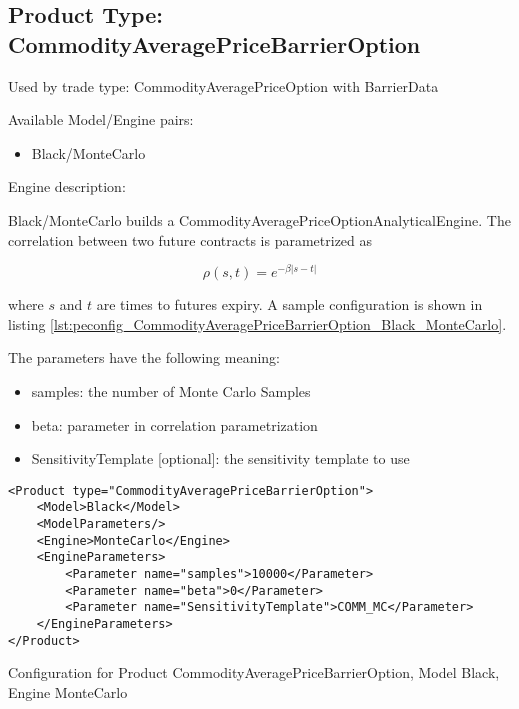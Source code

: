 \subsection{Product Type: CommodityAveragePriceBarrierOption}

Used by trade type: CommodityAveragePriceOption with BarrierData

Available Model/Engine pairs:

\begin{itemize}
\item Black/MonteCarlo
\end{itemize}

Engine description:

Black/MonteCarlo builds a CommodityAveragePriceOptionAnalyticalEngine. The correlation between two future contracts is
parametrized as

$$\rho(s, t) = e^{-\beta |s-t|}$$

where $s$ and $t$ are times to futures expiry. A sample configuration is shown in listing
\ref{lst:peconfig_CommodityAveragePriceBarrierOption_Black_MonteCarlo}.

The parameters have the following meaning:

\begin{itemize}
\item samples: the number of Monte Carlo Samples
\item beta: parameter in correlation parametrization
\item SensitivityTemplate [optional]: the sensitivity template to use 
\end{itemize}

\begin{longlisting}
\begin{verbatim}
<Product type="CommodityAveragePriceBarrierOption">
    <Model>Black</Model>
    <ModelParameters/>
    <Engine>MonteCarlo</Engine>
    <EngineParameters>
        <Parameter name="samples">10000</Parameter>
        <Parameter name="beta">0</Parameter>
        <Parameter name="SensitivityTemplate">COMM_MC</Parameter>
    </EngineParameters>
</Product>
\end{verbatim}
\caption{Configuration for Product CommodityAveragePriceBarrierOption, Model Black, Engine MonteCarlo}
\label{lst:peconfig_CommodityAveragePriceBarrierOption_Black_MonteCarlo}
\end{longlisting}

